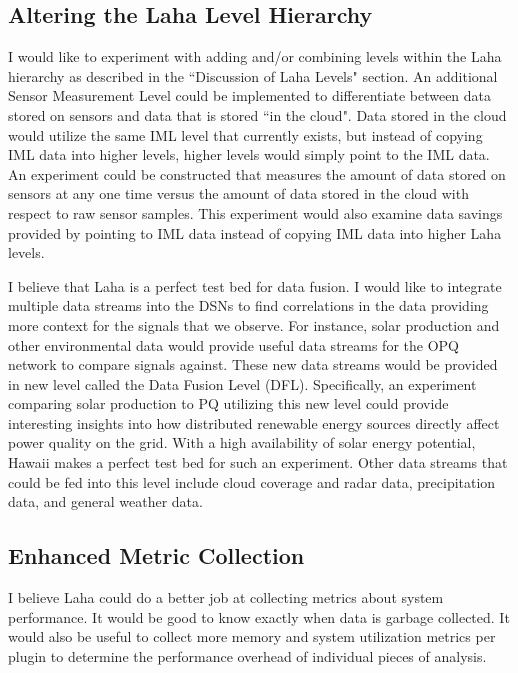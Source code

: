 \subsection{Altering the Laha Level Hierarchy}\label{subsec:altering-the-laha-level-hierarchy}
I would like to experiment with adding and/or combining levels within the Laha hierarchy as described in the ``Discussion of Laha Levels" section. An additional Sensor Measurement Level could be implemented to differentiate between data stored on sensors and data that is stored ``in the cloud". Data stored in the cloud would utilize the same IML level that currently exists, but instead of copying IML data into higher levels, higher levels would simply point to the IML data. An experiment could be constructed that measures the amount of data stored on sensors at any one time versus the amount of data stored in the cloud with respect to raw sensor samples. This experiment would also examine data savings provided by pointing to IML data instead of copying IML data into higher Laha levels.

I believe that Laha is a perfect test bed for data fusion. I would like to integrate multiple data streams into the DSNs to find correlations in the data providing more context for the signals that we observe. For instance, solar production and other environmental data would provide useful data streams for the OPQ network to compare signals against. These new data streams would be provided in new level called the Data Fusion Level (DFL). Specifically, an experiment comparing solar production to PQ utilizing this new level could provide interesting insights into how distributed renewable energy sources directly affect power quality on the grid. With a high availability of solar energy potential, Hawaii makes a perfect test bed for such an experiment. Other data streams that could be fed into this level include cloud coverage and radar data, precipitation data, and general weather data.

\subsection{Enhanced Metric Collection}\label{subsec:enhanced-metric-collection}
I believe Laha could do a better job at collecting metrics about system performance. It would be good to know exactly when data is garbage collected. It would also be useful to collect more memory and system utilization metrics per plugin to determine the performance overhead of individual pieces of analysis.

